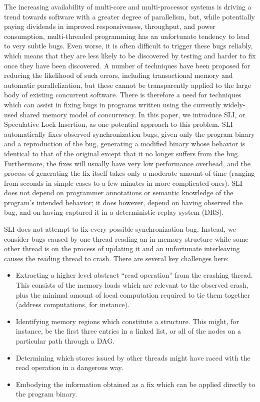 \documentclass[10pt,twocolumn,preprint,natbib,authoryear]{sigplanconf}
\begin{document}
The increasing availability of multi-core and multi-processor systems
is driving a trend towards software with a greater degree of
parallelism, but, while potentially paying dividends in improved
responsiveness, throughput, and power consumption, multi-threaded
programming has an unfortunate tendency to lead to very subtle bugs.
Even worse, it is often difficult to trigger these bugs reliably,
which means that they are less likely to be discovered by testing and
harder to fix once they have been discovered.  A number of techniques
have been proposed for reducing the likelihood of such errors,
including transactional memory\cite{Shavit1997} and automatic
parallelization\cite{Bacon1994}, but these cannot be transparently
applied to the large body of existing concurrent software.  There is
therefore a need for techniques which can assist in fixing bugs in
programs written using the currently widely-used shared memory model
of concurrency.  In this paper, we introduce SLI, or Speculative Lock
Insertion, as one potential approach to this problem.  SLI
automatically fixes observed synchronization bugs, given only the
program binary and a reproduction of the bug, generating a modified
binary whose behavior is identical to that of the original except that
it no longer suffers from the bug.  Furthermore, the fixes will
usually have very low performance overhead, and the process of
generating the fix itself takes only a moderate amount of time
(ranging from seconds in simple cases to a few minutes in more
complicated ones).  SLI does not depend on programmer annotations or
semantic knowledge of the program's intended behavior; it does
however, depend on having observed the bug, and on having captured it
in a deterministic replay system (DRS).

SLI does not attempt to fix every possible synchronization bug.
Instead, we consider bugs caused by one thread reading an in-memory
structure while some other thread is on the process of updating it and
an unfortunate interleaving causes the reading thread to crash.  There
are several key challenges here:

\begin{itemize}
\item Extracting a higher level abstract ``read operation'' from the
  crashing thread.  This consists of the memory loads which are
  relevant to the observed crash, plus the minimal amount of local
  computation required to tie them together (address computations, for
  instance).

\item Identifying memory regions which constitute a structure.  This
  might, for instance, be the first three entries in a linked list, or
  all of the nodes on a particular path through a
  DAG.

\item Determining which stores issued by other threads might have
  raced with the read operation in a dangerous way.

\item Embodying the information obtained as a fix which can be applied
  directly to the program binary.
\end{itemize}
\end{document}
